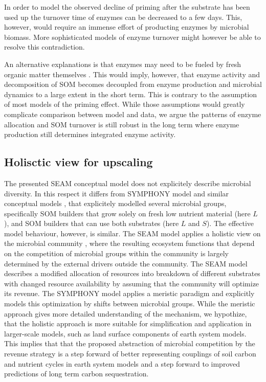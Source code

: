 In order to model the observed decline of priming after the substrate has
been used up the turnover time of enzymes can be decreased to a few days. This,
however, would require an immense effort of producting enzymes by microbial
biomass. More sophisticated models of enzyme turnover might however be able to
resolve this contradiction.

An alternative explanations is that enzymes may need to be fueled by fresh
organic matter themselves \citep{XXPrimingWorkshop Denmark}. This would imply,
however, that enzyme activity and decomposition of SOM becomes decoupled from
enzyme production and microbial dynamics to a large extent in the short term.
This is contrary to the assumption of most models of the priming effect. While
those assumptions would greatly complicate comparison between model and data, we
argue the patterns of enzyme allocation and SOM turnover is still robust in the
long term where enzyme production still determines integrated enzyme activity.
 
\subsection{Holisctic view for upscaling
\label{sec:Holistic}} 

The presented SEAM conceptual model does not explicitely
describe microbial diversity. In this respect it differs from SYMPHONY model
\citep{Perveen14} and similar conceptual models \citep{Fontaine03}, that
explicitely modelled several microbial groups, specifically SOM builders that grow solely on
fresh low nutrient material (here $L$), and SOM builders that can use both
substrates (here $L$ and $S$). The effective model behaviour, however, is
similar. The SEAM model applies a holistic view on the microbial community
\citep{Panikov10}, where the resulting ecosystem functions that depend on the
competition of microbial groups within the community is largely determined by
the external drivers outside the community. The SEAM model describes a modified
allocation of resources into breakdown of different substrates with changed
resource availability by assuming that the community will optimize its revenue.
The SYMPHONY model applies a meristic paradigm and explicitly models this
optimization by shifts between microbial groups. While the meristic approach
gives more detailed understanding of the mechanism, we hypothize, that the
holistic approach is more suitable for simplification \citep{Wutzler13} and
application in larger-scale models, such as land surface components of earth
system models.
This implies that that the proposed abstraction of microbial competition by the
revenue strategy is a step forward of better representing couplings of soil
carbon and nutrient cycles in earth system models and a step forward to improved
predictions of long term carbon sequestration.

